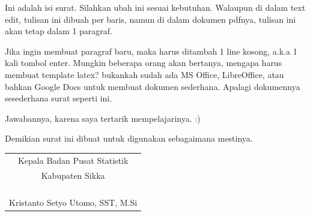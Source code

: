 \documentclass{article}
\begin{document}
Ini adalah isi surat.
Silahkan ubah ini sesuai kebutuhan.
Walaupun di dalam text edit, tulisan ini dibuah per baris,
namun di dalam dokumen pdfnya, tulisan ini akan tetap dalam 1 paragraf.

Jika ingin membuat paragraf baru, maka harus ditambah 1 line kosong, a.k.a 1 kali tombol enter.
Mungkin beberapa orang akan bertanya, mengapa harus membuat template latex?
bukankah sudah ada MS Office, LibreOffice, atau bahkan Google Docs untuk membuat dokumen sederhana.
Apalagi dokumennya sesederhana surat seperti ini.


Jawabannya, karena saya tertarik mempelajarinya. :)

Demikian surat ini dibuat untuk digunakan sebagaimana mestinya.

\bigskip %

\bigskip
\hfill
\begin{tabular}{@{}c}
	Kepala Badan Pusat Statistik\\
    Kabupaten Sikka \bigskip\\
    \\
    \\
    \\
    \\
	Kristanto Setyo Utomo, SST, M.Si
\end{tabular}
\end{document}
